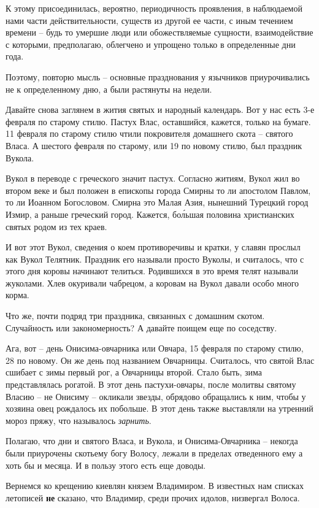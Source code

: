    К этому присоединилась, вероятно, периодичность проявления, в наблюдаемой нами части действительности, существ из другой ее части, с иным течением времени – будь то умершие люди или обожествляемые сущности, взаимодействие с которыми, предполагаю, облегчено и упрощено только в определенные дни года.

   Поэтому, повторю мысль – основные празднования у язычников приурочивались не к определенному дню, а были растянуты на недели.

   Давайте снова заглянем в жития святых и народный календарь. Вот у нас есть 3-е февраля по старому стилю. Пастух Влас, оставшийся, кажется, только на бумаге. 11 февраля по старому стилю чтили покровителя домашнего скота – святого Власа. А шестого февраля по старому, или 19 по новому стилю, был праздник Вукола.

   Вукол в переводе с греческого значит пастух. Согласно житиям, Вукол жил во втором веке и был положен в епископы города Смирны то ли апостолом Павлом, то ли Иоанном Богословом. Смирна это Малая Азия, нынешний Турецкий город Измир, а раньше греческий город. Кажется, бо\'льшая половина христианских святых родом из тех краев.

   И вот этот Вукол, сведения о коем противоречивы и кратки, у славян прослыл как Вукол Телятник. Праздник его называли просто Вуколы, и считалось, что с этого дня коровы начинают телиться. Родившихся в это время телят называли жуколами. Хлев окуривали чабрецом, а коровам на Вукол давали особо много корма.

   Что же, почти подряд три праздника, связанных с домашним скотом. Случайность или закономерность? А давайте поищем еще по соседству.

   Ага, вот – день Онисима-овчарника или Овчара, 15 февраля по старому стилю, 28 по новому. Он же день под названием Овчарницы. Считалось, что святой Влас сшибает с зимы первый рог, а Овчарницы второй. Стало быть, зима представлялась рогатой. В этот день пастухи-овчары, после молитвы святому Власию – не Онисиму – окликали звезды, обрядово обращались к ним, чтобы у хозяина овец рождалось их побольше. В этот день также выставляли на утренний мороз пряжу, что называлось \textit{ зарнить}.

   Полагаю, что дни и святого Власа, и Вукола, и Онисима-Овчарника – некогда были приурочены скотьему богу Волосу, лежали в пределах отведенного ему а хоть бы и месяца. И в пользу этого есть еще доводы.

   Вернемся ко крещению киевлян князем Владимиром. В известных нам списках летописей \textbf{не} сказано, что Владимир, среди прочих идолов, низвергал Волоса.

